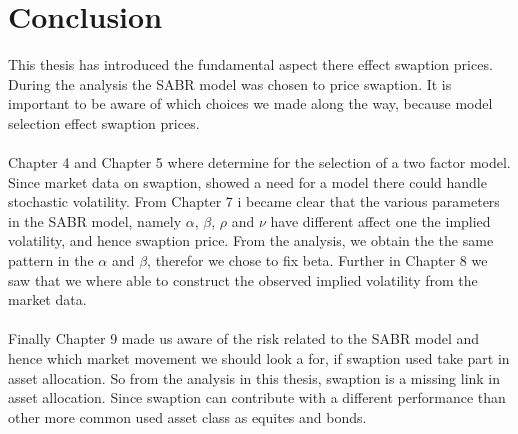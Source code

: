 \section{Conclusion}
This thesis has introduced the fundamental 
aspect there effect swaption prices. 
During the analysis the SABR model was chosen
to price swaption. It is important to be aware
of which choices we made along the way, 
because model selection effect swaption prices. 
\\\\
Chapter 4 and Chapter 5 where determine for 
the selection of a two factor model. 
Since market data on swaption, showed a need
for a model there could handle stochastic 
volatility. From Chapter 7 i became clear 
that the various parameters in the SABR model, 
namely $\alpha$, $\beta$, $\rho$ and $\nu$ 
have different affect one the implied volatility,
and hence swaption price. 
From the analysis, we obtain the the same pattern in 
the $\alpha$ and $\beta$, therefor we chose 
to fix beta. Further in Chapter 8 we saw that we
where able to construct the observed implied volatility
from the market data. 
\\\\
Finally Chapter 9 made us aware
of the risk related to the SABR model and hence which market 
movement we should look a for, if swaption used take part 
in asset allocation.  So from the analysis 
in this thesis, swaption is a missing link in asset 
allocation. Since swaption can contribute with 
a different performance than other more common used asset 
class as equites and bonds.
